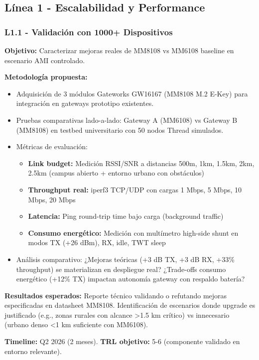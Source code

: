 \subsection{Línea 1 - Escalabilidad y Performance}

\subsubsection{L1.1 - Validación con 1000+ Dispositivos}

\textbf{Objetivo:} Caracterizar mejoras reales de MM8108 vs MM6108 baseline en escenario AMI controlado.

\textbf{Metodología propuesta:}
\begin{itemize}
    \item Adquisición de 3 módulos Gateworks GW16167 (MM8108 M.2 E-Key) para integración en gateways prototipo existentes.
    \item Pruebas comparativas lado-a-lado: Gateway A (MM6108) vs Gateway B (MM8108) en testbed universitario con 50 nodos Thread simulados.
    \item Métricas de evaluación:
    \begin{itemize}
        \item \textbf{Link budget:} Medición RSSI/SNR a distancias 500m, 1km, 1.5km, 2km, 2.5km (campus abierto + entorno urbano con obstáculos)
        \item \textbf{Throughput real:} iperf3 TCP/UDP con cargas 1 Mbps, 5 Mbps, 10 Mbps, 20 Mbps
        \item \textbf{Latencia:} Ping round-trip time bajo carga (background traffic)
        \item \textbf{Consumo energético:} Medición con multímetro high-side shunt en modos TX (+26 dBm), RX, idle, TWT sleep
    \end{itemize}
    \item Análisis comparativo: ¿Mejoras teóricas (+3 dB TX, +3 dB RX, +33\% throughput) se materializan en despliegue real? ¿Trade-offs consumo energético (+12\% TX) impactan autonomía gateway con respaldo batería?
\end{itemize}

\textbf{Resultados esperados:} Reporte técnico validando o refutando mejoras especificadas en datasheet MM8108. Identificación de escenarios donde upgrade es justificado (e.g., zonas rurales con alcance >1.5 km crítico) vs innecesario (urbano denso <1 km suficiente con MM6108).

\textbf{Timeline:} Q2 2026 (2 meses). \textbf{TRL objetivo:} 5-6 (componente validado en entorno relevante).

